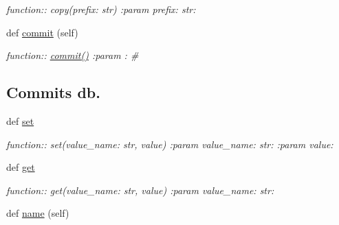 \begin{DoxyCompactItemize}
\begin{DoxyCompactList}\small\item\em function\+:\+: copy(prefix\+: str) \+:param prefix\+: str\+: \end{DoxyCompactList}\item 
def \hyperlink{classplume-creator_1_1src_1_1plume_1_1data_1_1property_1_1db__property_1_1_db_property_a383ac9f61b25ec2e6bbdc07e8a09e6fa}{commit} (self)
\begin{DoxyCompactList}\small\item\em function\+:\+: \hyperlink{classplume-creator_1_1src_1_1plume_1_1data_1_1property_1_1db__property_1_1_db_property_a383ac9f61b25ec2e6bbdc07e8a09e6fa}{commit()} \+:param \+: \# \subsection*{Commits db.}\end{DoxyCompactList}\item 
def \hyperlink{classplume-creator_1_1src_1_1plume_1_1data_1_1property_1_1db__property_1_1_db_property_a1b0393878851746935aa5d223f900d61}{set}\hypertarget{classplume-creator_1_1src_1_1plume_1_1data_1_1property_1_1db__property_1_1_db_property_a1b0393878851746935aa5d223f900d61}{}\label{classplume-creator_1_1src_1_1plume_1_1data_1_1property_1_1db__property_1_1_db_property_a1b0393878851746935aa5d223f900d61}

\begin{DoxyCompactList}\small\item\em function\+:\+: set(value\+\_\+name\+: str, value) \+:param value\+\_\+name\+: str\+: \+:param value\+: \end{DoxyCompactList}\item 
def \hyperlink{classplume-creator_1_1src_1_1plume_1_1data_1_1property_1_1db__property_1_1_db_property_aaa2026af6710f9edbf4f5be1d5bd2b9c}{get}\hypertarget{classplume-creator_1_1src_1_1plume_1_1data_1_1property_1_1db__property_1_1_db_property_aaa2026af6710f9edbf4f5be1d5bd2b9c}{}\label{classplume-creator_1_1src_1_1plume_1_1data_1_1property_1_1db__property_1_1_db_property_aaa2026af6710f9edbf4f5be1d5bd2b9c}

\begin{DoxyCompactList}\small\item\em function\+:\+: get(value\+\_\+name\+: str, value) \+:param value\+\_\+name\+: str\+: \end{DoxyCompactList}\item 
def \hyperlink{classplume-creator_1_1src_1_1plume_1_1data_1_1property_1_1db__property_1_1_db_property_ad84c4000d86e2b5b3262842ed7a8c1b3}{name} (self)\hypertarget{classplume-creator_1_1src_1_1plume_1_1data_1_1property_1_1db__property_1_1_db_property_ad84c4000d86e2b5b3262842ed7a8c1b3}{}\label{classplume-creator_1_1src_1_1plume_1_1data_1_1property_1_1db__property_1_1_db_property_ad84c4000d86e2b5b3262842ed7a8c1b3}


\end{DoxyCompactItemize}
